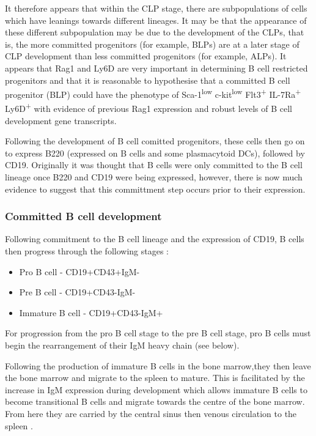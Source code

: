 It therefore appears that within the CLP stage, there are subpopulations of cells which have leanings towards different lineages.
It may be that the appearance of these different subpopulation may be due to the development of the CLPs, that is, the more committed progenitors (for example, BLPs) are at a later stage of CLP development than less committed progenitors (for example, ALPs).
It appears that Rag1 and Ly6D are very important in determining B cell restricted progenitors and that it is reasonable to hypothesise that a committed B cell progenitor (BLP) could have the phenotype of Sca-1\textsuperscript{low} c-kit\textsuperscript{low} Flt3\textsuperscript{+} IL-7Ra\textsuperscript{+} Ly6D\textsuperscript{+} with evidence of previous Rag1 expression and robust levels of B cell development gene transcripts.

Following the development of B cell comitted progenitors, these cells then go on to express B220 (expressed on B cells and some plasmacytoid DCs), followed by CD19.
Originally it was thought that B cells were only committed to the B cell lineage once B220 and CD19 were being expressed, however, there is now much evidence to suggest that this committment step occurs prior to their expression.


\subsubsection{Committed B cell development}

Following commitment to the B cell lineage and the expression of CD19, B cells then progress through the following stages \citep{Cambier2007}:
\begin{itemize}
\item Pro B cell - CD19+CD43+IgM-
\item Pre B cell - CD19+CD43-IgM-
\item Immature B cell - CD19+CD43-IgM+
\end{itemize}

For progression from the pro B cell stage to the pre B cell stage, pro B cells must begin the rearrangement of their IgM heavy chain (see below).

Following the production of immature B cells in the bone marrow,they then leave the bone marrow and migrate to the spleen to mature.
This is facilitated by the increase in IgM expression during development which allows immature B cells to become transitional B cells and migrate towards the centre of the bone marrow. 
From here they are carried by the central sinus then venous circulation to the spleen \citep{Loder1999}.


